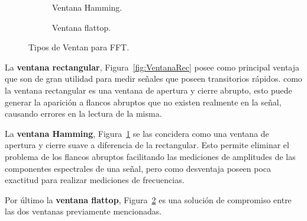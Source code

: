 \begin{figure}[H]
\begin{subfigure}[H]{0.45\textwidth}
            \caption{Ventana Hamming.}
            \label{fig:VentanaHamming}
            \end{subfigure}
            \hfill 
            \begin{subfigure}[H]{0.45\textwidth}
            \caption{Ventana flattop.}
            \label{fig:VentanaFlattop}
            \end{subfigure}

            \caption{Tipos de Ventan para FFT.}
            \label{fig:VentanasTipos}
        \end{figure}
    
    La \textbf{ventana rectangular}, Figura~\ref{fig:VentanaRec} posee como principal ventaja que son
    de gran utilidad para medir señales que poseen transitorios rápidos.
    como la ventana rectangular es una ventana de apertura y cierre abrupto, esto puede generar
    la aparición a flancos abruptos que no existen realmente en la señal, causando errores 
    en la lectura de la misma.
    
    La \textbf{ventana Hamming}, Figura~\ref{fig:VentanaHamming} se las concidera como una ventana de 
    apertura y cierre suave a diferencia de la rectangular. Esto permite eliminar el problema
    de los flancos abruptos facilitando las mediciones de amplitudes de las componentes 
    espectrales de una señal, pero como desventaja poseen poca exactitud para realizar 
    mediciones de frecuencias.
    
    Por último la \textbf{ventana flattop}, Figura~\ref{fig:VentanaFlattop} es una solución de compromiso
    entre las dos ventanas previamente mencionadas. 

